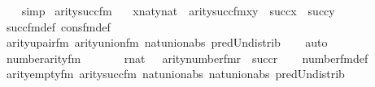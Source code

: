 \begin{isabellebody}
\ \ \isamarkupfalse%
\ simp%
\endisatagproof
{\isafoldproof}%
%
\isadelimproof
\isanewline
%
\endisadelimproof
\isanewline
{}\isamarkupfalse%
\ arity{\isacharunderscore}{\kern0pt}succ{\isacharunderscore}{\kern0pt}fm\ {\isacharcolon}{\kern0pt}\isanewline
\ \ {\isachardoublequoteopen}{\isasymlbrakk}x{\isasymin}nat{\isacharsemicolon}{\kern0pt}y{\isasymin}nat{\isasymrbrakk}\ {\isasymLongrightarrow}\ arity{\isacharparenleft}{\kern0pt}succ{\isacharunderscore}{\kern0pt}fm{\isacharparenleft}{\kern0pt}x{\isacharcomma}{\kern0pt}y{\isacharparenright}{\kern0pt}{\isacharparenright}{\kern0pt}\ {\isacharequal}{\kern0pt}\ succ{\isacharparenleft}{\kern0pt}x{\isacharparenright}{\kern0pt}\ {\isasymunion}\ succ{\isacharparenleft}{\kern0pt}y{\isacharparenright}{\kern0pt}{\isachardoublequoteclose}\isanewline
%
\isadelimproof
\ \ %
\endisadelimproof
%
\isatagproof
{}\isamarkupfalse%
\ succ{\isacharunderscore}{\kern0pt}fm{\isacharunderscore}{\kern0pt}def\ cons{\isacharunderscore}{\kern0pt}fm{\isacharunderscore}{\kern0pt}def\ \isanewline
\ \ \isamarkupfalse%
\ arity{\isacharunderscore}{\kern0pt}upair{\isacharunderscore}{\kern0pt}fm\ arity{\isacharunderscore}{\kern0pt}union{\isacharunderscore}{\kern0pt}fm\ nat{\isacharunderscore}{\kern0pt}union{\isacharunderscore}{\kern0pt}abs{}\ pred{\isacharunderscore}{\kern0pt}Un{\isacharunderscore}{\kern0pt}distrib\isanewline
\ \ \isamarkupfalse%
\ auto%
\endisatagproof
{\isafoldproof}%
%
\isadelimproof
\isanewline
%
\endisadelimproof
\isanewline
\isanewline
{}\isamarkupfalse%
\ number{}arity{\isacharunderscore}{\kern0pt}{\isacharunderscore}{\kern0pt}fm\ {\isacharcolon}{\kern0pt}\ \isanewline
\ \ \ \ {\isachardoublequoteopen}{\isasymlbrakk}\ r{\isasymin}nat\ {\isasymrbrakk}\ {\isasymLongrightarrow}\ arity{\isacharparenleft}{\kern0pt}number{}{\isacharunderscore}{\kern0pt}fm{\isacharparenleft}{\kern0pt}r{\isacharparenright}{\kern0pt}{\isacharparenright}{\kern0pt}\ {\isacharequal}{\kern0pt}\ succ{\isacharparenleft}{\kern0pt}r{\isacharparenright}{\kern0pt}{\isachardoublequoteclose}\isanewline
%
\isadelimproof
\ \ %
\endisadelimproof
%
\isatagproof
{}\isamarkupfalse%
\ number{}{\isacharunderscore}{\kern0pt}fm{\isacharunderscore}{\kern0pt}def\ \isanewline
\ \ \isamarkupfalse%
\ arity{\isacharunderscore}{\kern0pt}empty{\isacharunderscore}{\kern0pt}fm\ arity{\isacharunderscore}{\kern0pt}succ{\isacharunderscore}{\kern0pt}fm\ nat{\isacharunderscore}{\kern0pt}union{\isacharunderscore}{\kern0pt}abs{}\ nat{\isacharunderscore}{\kern0pt}union{\isacharunderscore}{\kern0pt}abs{}\ pred{\isacharunderscore}{\kern0pt}Un{\isacharunderscore}{\kern0pt}distrib\isanewline

\end{isabellebody}
